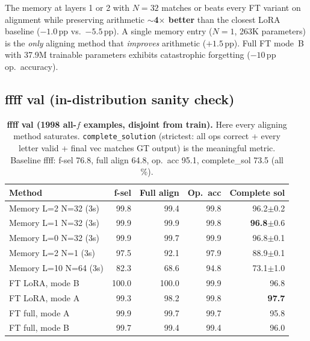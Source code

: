 \documentclass[10pt]{article}
\begin{document}
The memory at layers 1 or 2 with $N{=}32$ matches or beats every FT
variant on alignment while preserving arithmetic \textbf{$\sim$4$\times$
better} than the closest LoRA baseline ($-1.0$\,pp vs.\ $-5.5$\,pp). A
single memory entry ($N{=}1$, 263K parameters) is the \emph{only}
aligning method that \emph{improves} arithmetic ($+1.5$\,pp). Full FT
mode~B with 37.9M trainable parameters exhibits catastrophic forgetting
($-10$\,pp op.\ accuracy).

\subsection*{ffff val (in-distribution sanity check)}

\begin{table}[ht]
  \centering\small
  \caption{\textbf{ffff val (1998 all-$f$ examples, disjoint from train).}
    Here every aligning method saturates. \texttt{complete\_solution}
    (strictest: all ops correct + every letter valid + final vec matches GT
    output) is the meaningful metric. Baseline ffff: f-sel 76.8, full align
    64.8, op.\ acc 95.1, complete\_sol 73.5 (all \%).}
  \label{tab:ffff}
  \renewcommand{\arraystretch}{1.1}
  \begin{tabular}{lrrrr}
    \toprule
    \textbf{Method} & \textbf{f-sel} & \textbf{Full align} &
    \textbf{Op.\ acc} & \textbf{Complete sol} \\
    \midrule
    \rowcolor{rowhl} Memory L=2 N=32 (3s) & 99.8 & 99.4 & 99.8 & 96.2$\pm$0.2 \\
    \rowcolor{rowhl} Memory L=1 N=32 (3s) & 99.9 & 99.9 & 99.8 & \textbf{96.8}$\pm$0.6 \\
    Memory L=0 N=32 (3s)                  & 99.9 & 99.7 & 99.9 & 96.8$\pm$0.1 \\
    Memory L=2 N=1 (3s)                   & 97.5 & 92.1 & 97.9 & 88.9$\pm$0.1 \\
    Memory L=10 N=64 (3s)                 & 82.3 & 68.6 & 94.8 & 73.1$\pm$1.0 \\
    \midrule
    FT LoRA, mode B                       & 100.0 & 100.0 & 99.9 & 96.8 \\
    FT LoRA, mode A                       & 99.3 & 98.2 & 99.8 & \textbf{97.7} \\
    FT full, mode A                       & 99.9 & 99.7 & 99.7 & 95.8 \\
    FT full, mode B                       & 99.7 & 99.4 & 99.4 & 96.0 \\
    \bottomrule
  \end{tabular}
\end{table}
\end{document}
